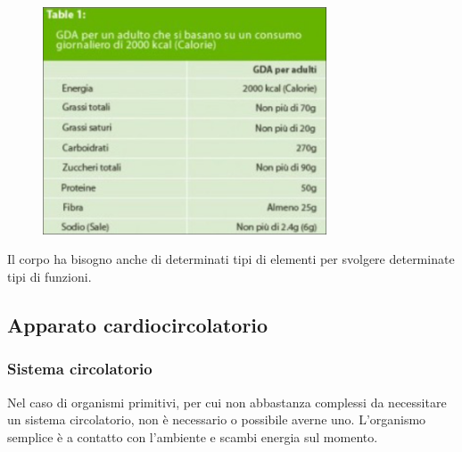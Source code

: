 \documentclass[a4paper]{article}
\begin{document}
\begin{center}
\begin{figure}[th]
    \centering
    \includegraphics[width=0.75\textwidth]{./daily_intake.png}
\end{figure}
\end{center}

Il corpo ha bisogno anche di determinati tipi di elementi per svolgere determinate tipi di funzioni.


\pagebreak

\subsection{Apparato cardiocircolatorio}

\subsubsection{Sistema circolatorio}


Nel caso di organismi primitivi, per cui non abbastanza complessi da necessitare un sistema circolatorio,
non è necessario o possibile averne uno.
L'organismo semplice è a contatto con l'ambiente e scambi energia sul momento.
\end{document}
